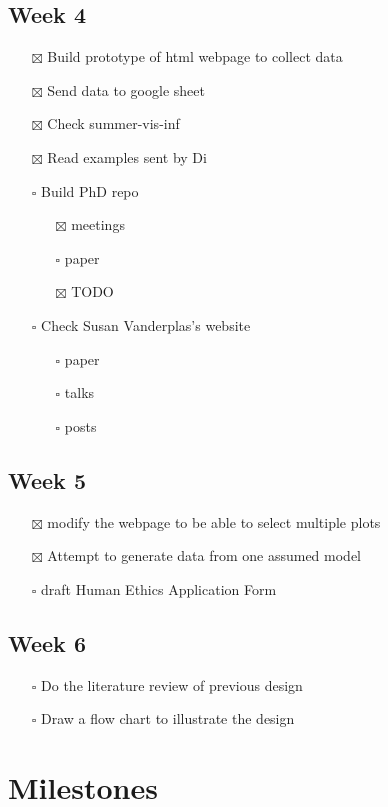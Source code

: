 \documentclass[
]{book}
\providecommand{\tightlist}{%
  \setlength{\itemsep}{0pt}\setlength{\parskip}{0pt}}
\begin{document}
\hypertarget{week-4}{%
\section{Week 4}\label{week-4}}

\begin{itemize}
\tightlist
\item[$\boxtimes$]
  Build prototype of html webpage to collect data
\item[$\boxtimes$]
  Send data to google sheet
\item[$\boxtimes$]
  Check summer-vis-inf
\item[$\boxtimes$]
  Read examples sent by Di
\item[$\square$]
  Build PhD repo

  \begin{itemize}
  \tightlist
  \item[$\boxtimes$]
    meetings
  \item[$\square$]
    paper
  \item[$\boxtimes$]
    TODO
  \end{itemize}
\item[$\square$]
  Check Susan Vanderplas's website

  \begin{itemize}
  \tightlist
  \item[$\square$]
    paper
  \item[$\square$]
    talks
  \item[$\square$]
    posts
  \end{itemize}
\end{itemize}

\hypertarget{week-5}{%
\section{Week 5}\label{week-5}}

\begin{itemize}
\tightlist
\item[$\boxtimes$]
  modify the webpage to be able to select multiple plots
\item[$\boxtimes$]
  Attempt to generate data from one assumed model
\item[$\square$]
  draft Human Ethics Application Form
\end{itemize}

\hypertarget{week-6}{%
\section{Week 6}\label{week-6}}

\begin{itemize}
\tightlist
\item[$\square$]
  Do the literature review of previous design
\item[$\square$]
  Draw a flow chart to illustrate the design
\end{itemize}

\hypertarget{milestones}{%
\chapter{Milestones}\label{milestones}}

  
\end{document}
